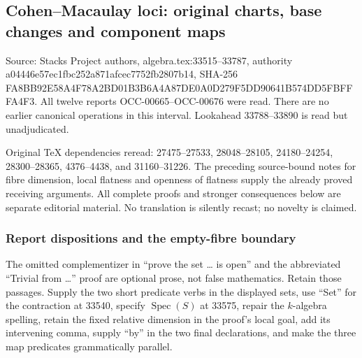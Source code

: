 \subsection{Cohen--Macaulay loci: original charts, base changes and component maps}\label{algebra-proof-040-cohenmacaulay-loci-original-charts-base-changes-and-component-maps}

Source: Stacks Project authors, algebra.\AlgebraIdentifierBreak{}tex:\AlgebraIdentifierBreak{}33515--\AlgebraIdentifierBreak{}33787, authority a044\allowbreak{}46e5\allowbreak{}7ec1\allowbreak{}fbc2\allowbreak{}52a8\allowbreak{}71af\allowbreak{}cec7\allowbreak{}752f\allowbreak{}b280\allowbreak{}7b14, SHA-256 FA8B\allowbreak{}B92E\allowbreak{}58A4\allowbreak{}F78A\allowbreak{}2BD0\allowbreak{}1B3B\allowbreak{}6A4A\allowbreak{}87DE\allowbreak{}0A0D\allowbreak{}279F\allowbreak{}5DD9\allowbreak{}0641\allowbreak{}B574\allowbreak{}DD5F\allowbreak{}BFFF\allowbreak{}A4F3. All twelve reports OCC-\AlgebraIdentifierBreak{}00665--\AlgebraIdentifierBreak{}OCC-\AlgebraIdentifierBreak{}00676 were read. There are no earlier canonical operations in this interval. Lookahead 33788--33890 is read but unadjudicated.

Original TeX dependencies reread: 27475--27533, 28048--28105, 24180--24254, 28300--28365, 4376--4438, and 31160--31226. The preceding source-bound notes for fibre dimension, local flatness and openness of flatness supply the already proved receiving arguments. All complete proofs and stronger consequences below are separate editorial material. No translation is silently recast; no novelty is claimed.

\subsubsection{Report dispositions and the empty-fibre boundary}\label{algebra-proof-040-report-dispositions-and-the-empty-fibre-boundary}

The omitted complementizer in ``prove the set \ldots{} is open'' and the abbreviated ``Trivial from \ldots'' proof are optional prose, not false mathematics. Retain those passages. Supply the two short predicate verbs in the displayed sets, use ``Set'' for the contraction at 33540, specify \(\operatorname{Spec}(S)\) at 33575, repair the \(k\)-algebra spelling, retain the fixed relative dimension in the proof's local goal, add its intervening comma, supply ``by'' in the two final declarations, and make the three map predicates grammatically parallel.

